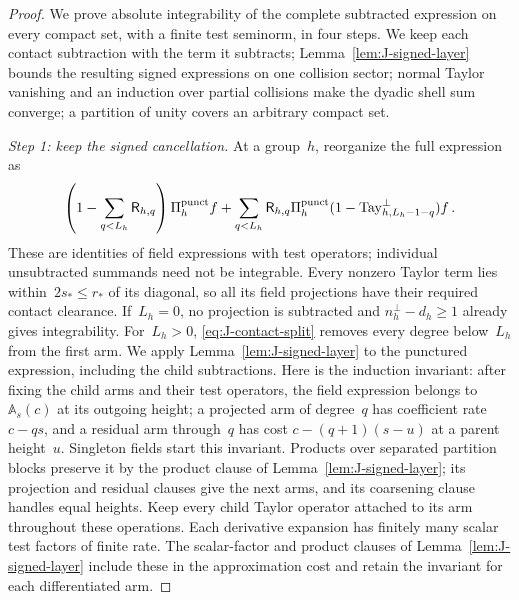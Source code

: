 \begin{proof}\label{proof:J2.2-start}
We prove absolute integrability of the complete subtracted expression on every compact set, with a finite test seminorm, in four steps. We keep each contact subtraction with the term it subtracts; Lemma~\ref{lem:J-signed-layer} bounds the resulting signed expressions on one collision sector; normal Taylor vanishing and an induction over partial collisions make the dyadic shell sum converge; a partition of unity covers an arbitrary compact set.

\emph{Step 1: keep the signed cancellation.} At a group~$h$, reorganize the full expression as
\begin{equation}\label{eq:J-contact-arms}
\left(1-\sum_{q<L_h}\mathsf R_{h,q}\right)\Pi_h^{\rm punct}f
+\sum_{q<L_h}\mathsf R_{h,q}\Pi_h^{\rm punct}
                  (1-\mathrm{Tay}_{h,L_h-1-q}^{\perp})f\,.
\end{equation}
These are identities of field expressions with test operators; individual unsubtracted summands need not be integrable. Every nonzero Taylor term lies within~$2s_*\le r_*$ of its diagonal, so all its field projections have their required contact clearance. If~$L_h=0$, no projection is subtracted and $n^\perp_h-d_h\ge1$ already gives integrability. For~$L_h>0$, \eqref{eq:J-contact-split} removes every degree below~$L_h$ from the first arm. We apply Lemma~\ref{lem:J-signed-layer} to the punctured expression, including the child subtractions. Here is the induction invariant: after fixing the child arms and their test operators, the field expression belongs to~$\mathbb A_s(c)$ at its outgoing height; a projected arm of degree~$q$ has coefficient rate~$c-qs$, and a residual arm through~$q$ has cost $c-(q+1)(s-u)$ at a parent height~$u$. Singleton fields start this invariant. Products over separated partition blocks preserve it by the product clause of Lemma~\ref{lem:J-signed-layer}; its projection and residual clauses give the next arms, and its coarsening clause handles equal heights. Keep every child Taylor operator attached to its arm throughout these operations. Each derivative expansion has finitely many scalar test factors of finite rate. The scalar-factor and product clauses of Lemma~\ref{lem:J-signed-layer} include these in the approximation cost and retain the invariant for each differentiated arm.


\end{proof}
